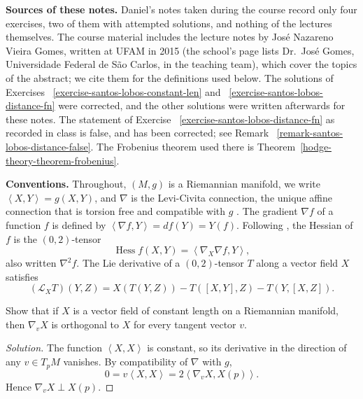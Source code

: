 \medskip\noindent
{\bf Sources of these notes.}
Daniel's notes taken during the course
record only four exercises, two of them
with attempted solutions, and nothing of
the lectures themselves. The course
material includes the lecture notes
\cite{gomes2015operadores} by José Nazareno
Vieira Gomes, written at UFAM in 2015
(the school's page lists Dr.\ José Gomes,
Universidade Federal de São Carlos, in
the teaching team), which cover
the topics of the abstract; we cite them
for the definitions used below. The
solutions of Exercises~%
\ref{exercise-santos-lobos-constant-len}
and~%
\ref{exercise-santos-lobos-distance-fn}
were corrected, and the other solutions
were written afterwards for these notes.
The statement of
Exercise~%
\ref{exercise-santos-lobos-distance-fn}
as recorded in class is false, and has been
corrected; see
Remark~%
\ref{remark-santos-lobos-distance-false}.
The Frobenius theorem used there is
Theorem~\ref{hodge-theory-theorem-frobenius}.

\medskip\noindent
{\bf Conventions.}
Throughout, $(M,g)$ is a Riemannian
manifold, we write
$\left\langle{} X,Y \right\rangle{}
= g(X,Y)$,
and $\nabla$ is the Levi-Civita connection,
the unique affine connection that is
torsion free and compatible with $g$
\cite[Section 1.3, Theorem 1.2]%
{gomes2015operadores}. The gradient
$\nabla f$ of a function $f$ is defined by
$\left\langle{} \nabla f, Y \right\rangle{}
= df(Y) = Y(f)$. Following
\cite[Section 2.1, Definition 2.10]%
{gomes2015operadores}, the Hessian of $f$
is the $(0,2)$-tensor
$$
\operatorname{Hess} f(X,Y) =
\left\langle{} \nabla_X \nabla f, Y
\right\rangle{},
$$
also written $\nabla^2 f$. The Lie
derivative of a $(0,2)$-tensor $T$ along a
vector field $X$ satisfies
\cite[Chapter 2, p.~22]{gomes2015operadores}
$$
(\mathcal{L}_X T)(Y,Z) =
X(T(Y,Z)) - T([X,Y],Z) - T(Y,[X,Z]).
$$

\begin{exercise}
\label{exercise-santos-lobos-constant-len}
Show that if $X$ is a vector field of
constant length on a Riemannian manifold,
then $\nabla_v X$ is orthogonal to $X$ for
every tangent vector $v$.
\end{exercise}

\begin{proof}[Solution]
The function
$\left\langle{} X,X \right\rangle{}$ is
constant, so its derivative in the
direction of any $v \in T_pM$ vanishes.
By compatibility of $\nabla$ with $g$,
$$
0 = v\left\langle{} X,X \right\rangle{}
= 2\left\langle{} \nabla_v X, X(p)
\right\rangle{}.
$$
Hence $\nabla_v X \perp X(p)$.
\end{proof}

